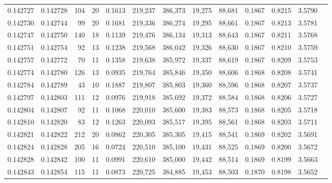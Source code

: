 \begin{tabular}{rrrrrrrrrrrrr}
0.142727 & 0.142728 &   104 &  20 &                                     0.1613 & 219,237 & 386,373 &  19,275 &  88,681 & 0.1867 & 0.8215 & 3.5790 \\
0.142730 & 0.142744 &    99 &  20 &                                     0.1681 & 219,336 & 386,274 &  19,295 &  88,661 & 0.1867 & 0.8213 & 3.5781 \\
0.142747 & 0.142750 &   140 &  18 &                                     0.1139 & 219,476 & 386,134 &  19,313 &  88,643 & 0.1867 & 0.8211 & 3.5768 \\
0.142751 & 0.142754 &    92 &  13 &                                     0.1238 & 219,568 & 386,042 &  19,326 &  88,630 & 0.1867 & 0.8210 & 3.5759 \\
0.142757 & 0.142772 &    70 &  11 &                                     0.1358 & 219,638 & 385,972 &  19,337 &  88,619 & 0.1867 & 0.8209 & 3.5753 \\
0.142774 & 0.142780 &   126 &  13 &                                     0.0935 & 219,764 & 385,846 &  19,350 &  88,606 & 0.1868 & 0.8208 & 3.5741 \\
0.142784 & 0.142789 &    43 &  10 &                                     0.1887 & 219,807 & 385,803 &  19,360 &  88,596 & 0.1868 & 0.8207 & 3.5737 \\
0.142797 & 0.142803 &   111 &  12 &                                     0.0976 & 219,918 & 385,692 &  19,372 &  88,584 & 0.1868 & 0.8206 & 3.5727 \\
0.142804 & 0.142807 &    92 &  11 &                                     0.1068 & 220,010 & 385,600 &  19,383 &  88,573 & 0.1868 & 0.8205 & 3.5718 \\
0.142810 & 0.142820 &    83 &  12 &                                     0.1263 & 220,093 & 385,517 &  19,395 &  88,561 & 0.1868 & 0.8203 & 3.5711 \\
0.142821 & 0.142822 &   212 &  20 &                                     0.0862 & 220,305 & 385,305 &  19,415 &  88,541 & 0.1869 & 0.8202 & 3.5691 \\
0.142824 & 0.142828 &   205 &  16 &                                     0.0724 & 220,510 & 385,100 &  19,431 &  88,525 & 0.1869 & 0.8200 & 3.5672 \\
0.142828 & 0.142842 &   100 &  11 &                                     0.0991 & 220,610 & 385,000 &  19,442 &  88,514 & 0.1869 & 0.8199 & 3.5663 \\
0.142843 & 0.142854 &   115 &  11 &                                     0.0873 & 220,725 & 384,885 &  19,453 &  88,503 & 0.1870 & 0.8198 & 3.5652 \\

\end{tabular}
